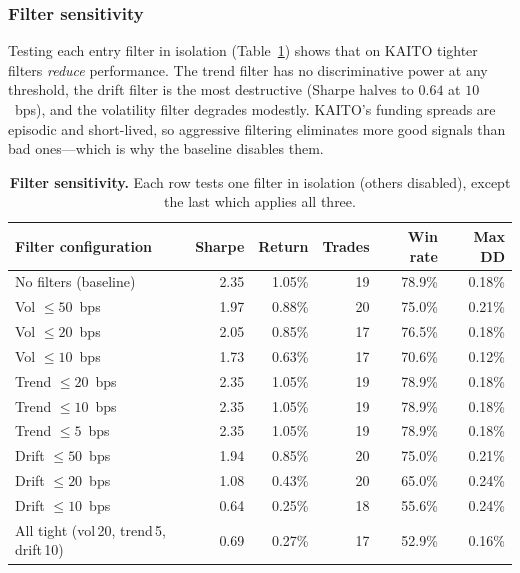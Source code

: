 \documentclass[10pt,twocolumn,a4paper]{article}
\begin{document}
\subsubsection{Filter sensitivity}

Testing each entry filter in isolation (Table~\ref{tab:s1-filter}) shows
that on KAITO tighter filters \emph{reduce} performance.  The trend filter
has no discriminative power at any threshold, the drift filter is the most
destructive (Sharpe halves to $0.64$ at $10$~bps), and the volatility
filter degrades modestly.  KAITO's funding spreads are episodic and
short-lived, so aggressive filtering eliminates more good signals than bad
ones---which is why the baseline disables them.

\begin{table}[t!]
  \centering
  \caption{\textbf{Filter sensitivity.}  Each row tests one filter in
           isolation (others disabled), except the last which applies all
           three.}
  \label{tab:s1-filter}
  \begin{tabular}{lrrrrr}
    \toprule
    \textbf{Filter configuration} & \textbf{Sharpe} & \textbf{Return}
      & \textbf{Trades} & \textbf{Win rate} & \textbf{Max DD} \\
    \midrule
    No filters (baseline)               & 2.35 & 1.05\% & 19 & 78.9\% & 0.18\% \\
    Vol $\le 50$~bps                    & 1.97 & 0.88\% & 20 & 75.0\% & 0.21\% \\
    Vol $\le 20$~bps                    & 2.05 & 0.85\% & 17 & 76.5\% & 0.18\% \\
    Vol $\le 10$~bps                    & 1.73 & 0.63\% & 17 & 70.6\% & 0.12\% \\
    Trend $\le 20$~bps                  & 2.35 & 1.05\% & 19 & 78.9\% & 0.18\% \\
    Trend $\le 10$~bps                  & 2.35 & 1.05\% & 19 & 78.9\% & 0.18\% \\
    Trend $\le 5$~bps                   & 2.35 & 1.05\% & 19 & 78.9\% & 0.18\% \\
    Drift $\le 50$~bps                  & 1.94 & 0.85\% & 20 & 75.0\% & 0.21\% \\
    Drift $\le 20$~bps                  & 1.08 & 0.43\% & 20 & 65.0\% & 0.24\% \\
    Drift $\le 10$~bps                  & 0.64 & 0.25\% & 18 & 55.6\% & 0.24\% \\
    All tight (vol\,20, trend\,5, drift\,10) & 0.69 & 0.27\% & 17 & 52.9\% & 0.16\% \\
    \bottomrule
  \end{tabular}
\end{table}
\end{document}
